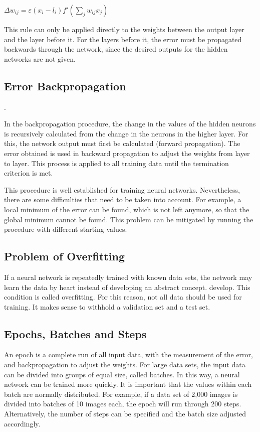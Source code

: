 \begin{center}
$\Delta w_{ij} = \varepsilon  (x_i - l_i)  f'(\sum_{j} w_{ij} x_j) $
\end{center}

This rule can only be applied directly to the weights between the output layer and the layer before it. For the layers before it, the error must be propagated backwards through the network, since the desired outputs for the hidden networks are not given. \cite{Kruse:2015} 

\subsection{Error Backpropagation}. 

In the backpropagation procedure, the change in the values of the hidden neurons is recursively calculated from the change in the neurons in the higher layer. For this, the network output must first be calculated (forward propagation). The error obtained is used in backward propagation to adjust the weights from layer to layer. This process is applied to all training data until the termination criterion is met. \cite{Ertel:2016}

This procedure is well established for training neural networks. Nevertheless, there are some difficulties that need to be taken into account. For example, a local minimum of the error can be found, which is not left anymore, so that the global minimum cannot be found. This problem can be mitigated by running the procedure with different starting values. \cite{Kruse:2015}

\subsection{Problem of Overfitting}

If a neural network is repeatedly trained with known data sets, the network may learn the data by heart instead of developing an abstract concept.
develop. This condition is called overfitting. For this reason, not all data should be used for training. It makes sense to withhold a validation set and a test set. \cite{Becker:2018}

	
	
\subsection{Epochs, Batches and Steps}

An epoch is a complete run of all input data, with the measurement of the error, and backpropagation to adjust the weights. For large data sets, the input data can be divided into groups of equal size, called batches. In this way, a neural network can be trained more quickly. It is important that the values within each batch are normally distributed. For example, if a data set of 2,000 images is divided into batches of 10 images each, the epoch will run through 200 steps. Alternatively, the number of steps can be specified and the batch size adjusted accordingly.\cite{Becker:2018c}

